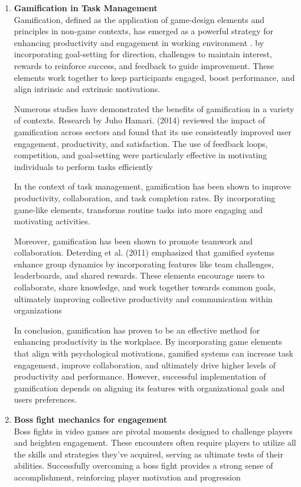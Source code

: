 \begin{enumerate}
    \item \textbf{Gamification in Task Management} \\
        Gamification, defined as the application of game-design elements and principles in non-game contexts, has emerged as a powerful strategy for enhancing productivity and engagement in working environment \cite{ncbi:pmc10905147} \cite{Employee:Gamification}.
        by incorporating goal-setting for direction, challenges to maintain interest, rewards to reinforce success, and feedback to guide improvement. These elements work together to keep participants engaged, boost performance, and align intrinsic and extrinsic motivations. \cite{Game:Reward}
        
        Numerous studies have demonstrated the benefits of gamification in a variety of contexts. Research by Juho Hamari. (2014) \cite{6758978} reviewed the impact of gamification across sectors and found that its use consistently improved user engagement, productivity, and satisfaction.
        The use of feedback loops, competition, and goal-setting were particularly effective in motivating individuals to perform tasks efficiently

        In the context of task management, gamification has been shown to improve productivity, collaboration, and task completion rates. By incorporating game-like elements, transforms routine tasks into more engaging and motivating activities.
    
        Moreover, gamification has been shown to promote teamwork and collaboration. Deterding et al. (2011) \cite{gamification:designElement} emphasized that gamified systems enhance group dynamics by incorporating features like team challenges, leaderboards, and shared rewards. These elements encourage users to collaborate, share knowledge, and work together towards common goals, ultimately improving collective productivity and communication within organizations
    
        In conclusion, gamification has proven to be an effective method for enhancing productivity in the workplace. By incorporating game elements that align with psychological motivations, gamified systems can increase task engagement, improve collaboration, and ultimately drive higher levels of productivity and performance. However, successful implementation of gamification depends on aligning its features with organizational goals and users preferences.
    \item \textbf{Boss fight mechanics for engagement} \\
        Boss fights in video games are pivotal moments designed to challenge players and heighten engagement. These encounters often require players to utilize all the skills and strategies they've acquired, serving as ultimate tests of their abilities. Successfully overcoming a boss fight provides a strong sense of accomplishment, reinforcing player motivation and progression \cite{toxigon:bossFight}
        

\end{enumerate}
